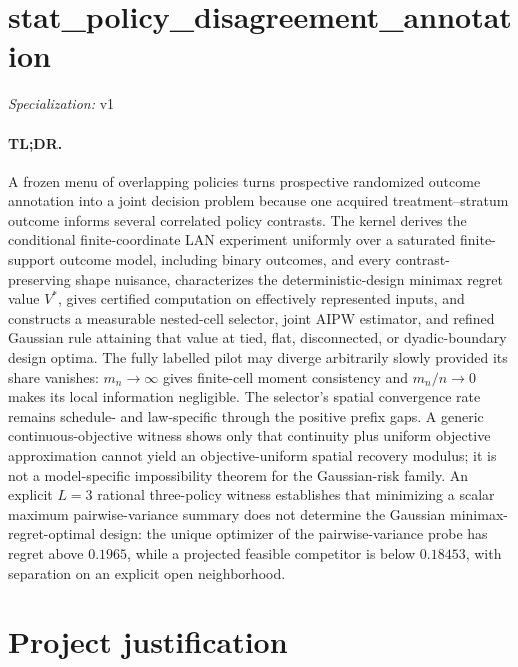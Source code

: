 \documentclass{article}
\begin{document}
\sloppy

\section*{stat\_\allowbreak{}policy\_\allowbreak{}disagreement\_\allowbreak{}annotation}

\noindent\textit{Specialization:} v1\par

\paragraph{TL;DR.} A frozen menu of overlapping policies turns prospective randomized outcome annotation into a joint decision problem because one acquired treatment--stratum outcome informs several correlated policy contrasts. The kernel derives the conditional finite-coordinate LAN experiment uniformly over a saturated finite-support outcome model, including binary outcomes, and every contrast-preserving shape nuisance, characterizes the deterministic-design minimax regret value \(V^*\), gives certified computation on effectively represented inputs, and constructs a measurable nested-cell selector, joint AIPW estimator, and refined Gaussian rule attaining that value at tied, flat, disconnected, or dyadic-boundary design optima. The fully labelled pilot may diverge arbitrarily slowly provided its share vanishes: \(m_n\to\infty\) gives finite-cell moment consistency and \(m_n/n\to0\) makes its local information negligible. The selector's spatial convergence rate remains schedule- and law-specific through the positive prefix gaps. A generic continuous-objective witness shows only that continuity plus uniform objective approximation cannot yield an objective-uniform spatial recovery modulus; it is not a model-specific impossibility theorem for the Gaussian-risk family. An explicit \(L=3\) rational three-policy witness establishes that minimizing a scalar maximum pairwise-variance summary does not determine the Gaussian minimax-regret-optimal design: the unique optimizer of the pairwise-variance probe has regret above \(0.1965\), while a projected feasible competitor is below \(0.18453\), with separation on an explicit open neighborhood.

\section{Project justification}
\end{document}
